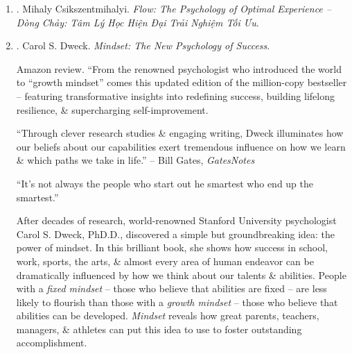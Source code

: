 \documentclass{article}
\begin{document}
\begin{enumerate}
	\item \cite{Csikszentmihalyi_flow_VN}. {\sc Mihaly Csikszentmihalyi}. {\it Flow: The Psychology of Optimal Experience -- Dòng Chảy: Tâm Lý Học Hiện Đại Trải Nghiệm Tối Ưu}.\hfill{\sf[done]}
	
	\item \cite{Dweck_mindset}. {\sc Carol S. Dweck}. {\it Mindset: The New Psychology of Success}. {}
	
	{\sf Amazon review.} ``From the renowned psychologist who introduced the world to ``growth mindset'' comes this updated edition of the million-copy bestseller -- featuring transformative insights into redefining success, building lifelong resilience, \& supercharging self-improvement.
	
	``Through clever research studies \& engaging writing, {\sc Dweck} illuminates how our beliefs about our capabilities exert tremendous influence on how we learn \& which paths we take in life.'' -- {\sc Bill Gates}, {\it GatesNotes}
	
	``It's not always the people who start out he smartest who end up the smartest.''
	
	After decades of research, world-renowned Stanford University psychologist {\sc Carol S. Dweck}, PhD.D., discovered a simple but groundbreaking idea: the power of mindset. In this brilliant book, she shows how success in school, work, sports, the arts, \& almost every area of human endeavor can be dramatically influenced by how we think about our talents \& abilities. People with a {\it fixed mindset} -- those who believe that abilities are fixed -- are less likely to flourish than those with a {\it growth mindset} -- those who believe that abilities can be developed. {\it Mindset} reveals how great parents, teachers, managers, \& athletes can put this idea to use to foster outstanding accomplishment.
	

\end{enumerate}
\end{document}
